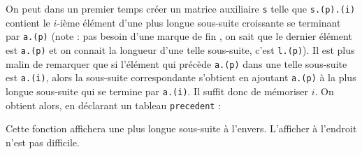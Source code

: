 \Q
On peut dans un premier temps créer un matrice auxiliaire \texttt{s} telle que \texttt{s.(p).(i)} contient le $i$-ième élément d'une plus longue sous-suite croissante se terminant par \texttt{a.(p)} (note : pas besoin d'une \og marque de fin \fg{}, on sait que le dernier élément est \texttt{a.(p)} et on connait la longueur d'une telle sous-suite, c'est \texttt{l.(p)}). Il est plus malin de remarquer que si l'élément qui précède \texttt{a.(p)} dans une telle sous-suite est \texttt{a.(i)}, alors la sous-suite correspondante s'obtient en ajoutant \texttt{a.(p)} à la plus longue sous-suite qui se termine par \texttt{a.(i)}. Il suffit donc de mémoriser $i$. On obtient alors, en déclarant un tableau \texttt{precedent} :



Cette fonction affichera une plus longue sous-suite à l'envers. L'afficher à l'endroit n'est pas difficile.

\Fin
